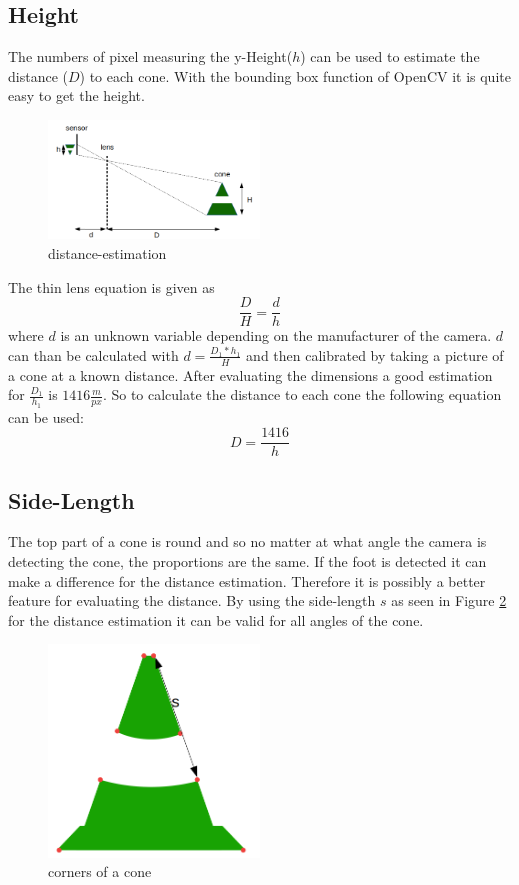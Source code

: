\documentclass[10pt,a4paper]{article}
\begin{document}
	\subsection{Height} \label{height-estimation}
	The numbers of pixel measuring the y-Height($h$) can be used to estimate the distance ($D$) to each cone. With the bounding box function of OpenCV it is quite easy to get the height. 
	\begin{figure}[h]
		\centering
		\includegraphics[width=0.5\textwidth]{Abb/distance-estimation.png}
		\caption{distance-estimation}
		\label{distance-estimation}
	\end{figure}
	The thin lens equation is given as
	$$\frac{D}{H}=\frac{d}{h}$$
	where $d$ is an unknown variable depending on the manufacturer of the camera.
	$d$ can than be calculated with $d=\frac{D_1*h_1}{H}$ and then calibrated by taking a picture of a cone at a known distance. After evaluating the dimensions a good estimation for $\frac{D_1}{h_1}$ is $1416\frac{m}{px}$.
	So to calculate the distance to each cone the following equation can be used:
	$$D = \frac{1416}{h}$$
	
	\subsection{Side-Length}
	The top part of a cone is round and so no matter at what angle the camera is detecting the cone, the proportions are the same. If the foot is detected it can make a difference for the distance estimation. Therefore it is possibly a better feature for evaluating the distance.
	By using the side-length $s$ as seen in Figure \ref{corners} for the distance estimation it can be valid for all angles of the cone.
	
	\begin{figure}[h]
		\centering
		\includegraphics[width=0.5\textwidth]{Abb/corners.png}
		\caption{corners of a cone}
		\label{corners}
	\end{figure}
	
\end{document}
